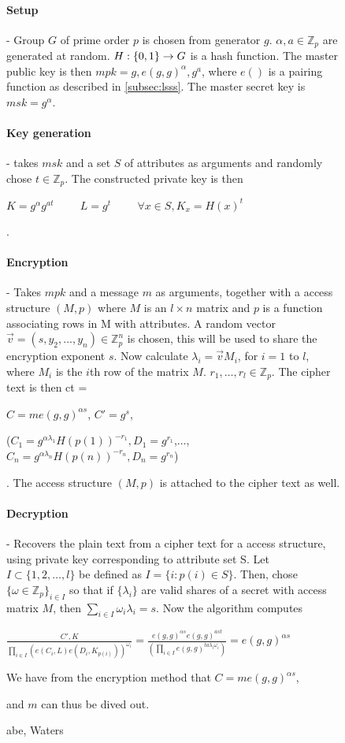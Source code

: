 \begin{figure}[H]
\begin{mdframed}
\paragraph{Setup} - Group $G$ of prime order $p$ is chosen from generator $g$. $\alpha, a \in \mathbb{Z}_p$ are generated at random. $H: \{0,1\}\* \rightarrow G$ is a hash function. The master public key is then $mpk = g, e(g,g)^{\alpha}, g^a$, where $e()$ is a pairing function as described in \ref{subsec:lsss}. The master secret key is $msk = g^{\alpha}$.
\
\paragraph{Key generation} - takes $msk$ and a set $S$ of attributes as arguments and randomly chose $t \in \mathbb{Z}_p$. The constructed private key is then \\ \centerline{$K = g^{\alpha}g^{at}\hspace{1cm} L = g^t \hspace{1cm}   \forall x\in S, K_x = H(x)^t$}.
\\
\paragraph{Encryption} - Takes $mpk$ and a message $m$ as arguments, together with a access structure $(M,p)$ where $M$ is an $l\times n$ matrix and $p$ is a function associating rows in M with attributes. A random vector $\vec{v} = (s, y_2, ..., y_n)\in \mathbb{Z}_p^n$ is chosen, this will be used to share the encryption exponent $s$. Now calculate $\lambda_i = \vec{v} M_i$, for $i=1$ to $l$, where $M_i$ is the $i$th row of the matrix $M$. $r_1,\dots,r_l \in \mathbb{Z}_p$. The cipher text is then ct = \\
\centerline{$C=me(g,g)^{\alpha s}$, $C'=g^s$,}
\centerline{($C_1 = g^{\alpha \lambda_1} H(p(1))^{-r_1}, D_1=g^{r_1}$,$\dots$,$C_n = g^{\alpha \lambda_n} H(p(n))^{-r_n}, D_n=g^{r_n}$)}.
The access structure $(M,p)$ is attached to the cipher text as well.
\\
\paragraph{Decryption} - Recovers the plain text from a cipher text for a access structure, using private key corresponding to attribute set S. Let $I \subset \{1,2,\dots,l\}$ be defined as $I = \{i : p(i) \in S\}$. Then, chose $\{\omega \in \mathbb{Z}_p\}_{i\in I}$ so that if $\{\lambda_i\}$ are valid shares of a secret with access matrix $M$, then $\sum_{i\in I}\omega_i \lambda_i = s$. Now the algorithm computes
\centerline{$\frac{C',K }{\prod_{i\in I}(e(C_i,L)e(D_i,K_{p(i)}))^{\omega_i}} = \frac{e(g,g)^{\alpha s}e(g,g)^{ast}}{(\prod_{i\in I}e(g,g)^{ta\lambda_i\omega_i})}=e(g,g)^{\alpha s}$}
\centerline{We have from the encryption method that $C=me(g,g)^{\alpha s}$, }
\centerline{and $m$ can thus be dived out.}


\caption{\gls{abe}, Waters\cite{abe_waters09}}
\label{fig:abe_math}
\end{mdframed}
\end{figure}
